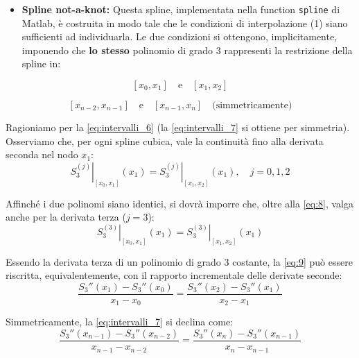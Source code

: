 \begin{itemize}
    \textbf{OSS:} Quindi una spline cubica periodica vuole essere una approssimazione qualitativamente simile alla funzione approssimata.
    \item \textbf{Spline not-a-knot:} Questa spline, implementata nella function \texttt{spline} di Matlab, è costruita in modo tale che le condizioni di interpolazione (1) siano sufficienti ad individuarla. Le due condizioni si ottengono, implicitamente, imponendo che \textbf{lo stesso} polinomio di grado 3 rappresenti la restrizione della spline in:
\end{itemize}



\begin{equation} \label{eq:intervalli_6}
[x_0, x_1] \quad \text{e} \quad [x_1, x_2]
\end{equation}

\begin{equation} \label{eq:intervalli_7}
[x_{n-2}, x_{n-1}] \quad \text{e} \quad [x_{n-1}, x_n] \quad \text{(simmetricamente)}
\end{equation}

Ragioniamo per la \eqref{eq:intervalli_6} (la \eqref{eq:intervalli_7} si ottiene per simmetria). Osserviamo che, per ogni spline cubica, vale la continuità fino alla derivata seconda nel nodo $x_1$:
\begin{equation} \label{eq:8}
\left. S_3^{(j)} \right|_{[x_0,x_1]}(x_1) = \left. S_3^{(j)} \right|_{[x_1,x_2]}(x_1), \quad j=0,1,2
\end{equation}

Affinché i due polinomi siano identici, si dovrà imporre che, oltre alla \eqref{eq:8}, valga anche per la derivata terza ($j=3$):
\begin{equation} \label{eq:9}
\left. S_3^{(3)} \right|_{[x_0,x_1]}(x_1) = \left. S_3^{(3)} \right|_{[x_1,x_2]}(x_1)
\end{equation}

Essendo la derivata terza di un polinomio di grado 3 costante, la \eqref{eq:9} può essere riscritta, equivalentemente, con il rapporto incrementale delle derivate seconde:
\begin{equation} \label{eq:10}
\frac{S_3''(x_1) - S_3''(x_0)}{x_1 - x_0} = \frac{S_3''(x_2) - S_3''(x_1)}{x_2 - x_1}
\end{equation}

Simmetricamente, la \eqref{eq:intervalli_7} si declina come:
\begin{equation} \label{eq:11}
\frac{S_3''(x_{n-1}) - S_3''(x_{n-2})}{x_{n-1} - x_{n-2}} = \frac{S_3''(x_n) - S_3''(x_{n-1})}{x_n - x_{n-1}}
\end{equation}

